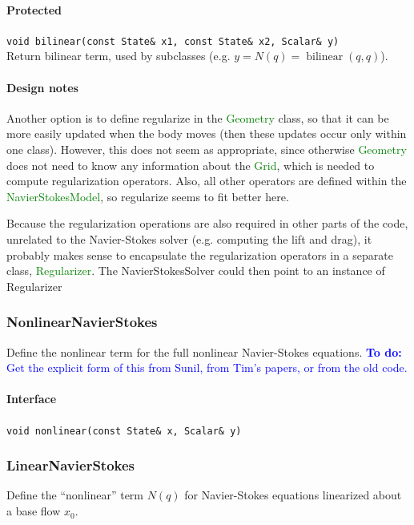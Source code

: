 \documentclass[11pt]{article}
\def\todo#1{\textcolor{blue}{{\bf To do:} #1}}
\def\class#1{\textcolor{green}{\ttfamily\small #1}} %
\def\fn#1{{\ttfamily\small #1}} %
\let\code\lstinline
\begin{document}
\paragraph{Protected}
\begin{description}
	\item \code|void bilinear(const State& x1, const State& x2, Scalar& y)|\\
		Return bilinear term, used by subclasses (e.g. $y = N(q)=\operatorname{bilinear}(q,q)$).
\end{description}

\paragraph{Design notes}
Another option is to define \fn{regularize} in the \class{Geometry} class, so that it can be more easily updated when the body moves (then these updates occur only within one class).  However, this does not seem as appropriate, since otherwise \class{Geometry} does not need to know any information about the \class{Grid}, which is needed to compute regularization operators.  Also, all other operators are defined within the \class{NavierStokesModel}, so \fn{regularize} seems to fit better here.

Because the regularization operations are also required in other parts of the code, unrelated to the Navier-Stokes solver (e.g. computing the lift and drag), it probably makes sense to encapsulate the regularization operators in a separate class, \class{Regularizer}.  The NavierStokesSolver could then point to an instance of Regularizer

\subsubsection{NonlinearNavierStokes}
Define the nonlinear term for the full nonlinear Navier-Stokes equations.
\todo{Get the explicit form of this from Sunil, from Tim's papers, or from the old code.}
\paragraph{Interface}
\begin{description}
	\item \code|void nonlinear(const State& x, Scalar& y)|
\end{description}

\subsubsection{LinearNavierStokes}
Define the ``nonlinear'' term $N(q)$ for Navier-Stokes equations linearized about a base flow $x_0$.
\end{document}
